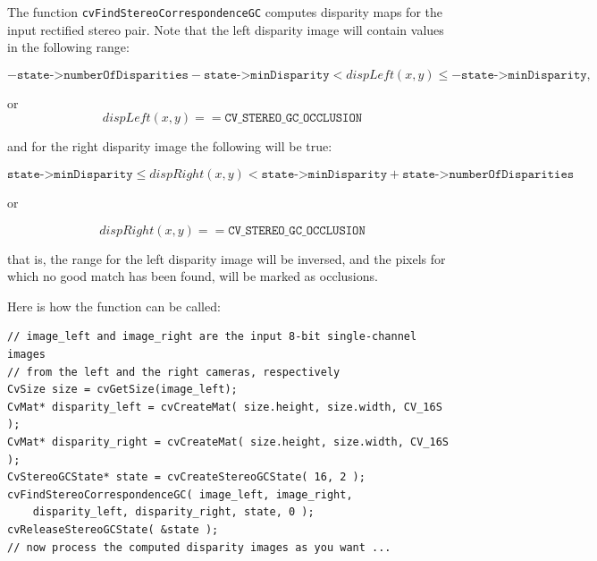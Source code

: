 \begin{description}
\end{description}

The function \texttt{cvFindStereoCorrespondenceGC} computes disparity maps for the input rectified stereo pair. Note that the left disparity image will contain values in the following range: 

\[
-\texttt{state->numberOfDisparities}-\texttt{state->minDisparity}
< dispLeft(x,y) \le -\texttt{state->minDisparity},
\]

or
\[
dispLeft(x,y) == \texttt{CV\_STEREO\_GC\_OCCLUSION}
\]

and for the right disparity image the following will be true: 

\[
\texttt{state->minDisparity} \le dispRight(x,y) 
< \texttt{state->minDisparity} + \texttt{state->numberOfDisparities}
\]

or

\[
dispRight(x,y) == \texttt{CV\_STEREO\_GC\_OCCLUSION}
\]

that is, the range for the left disparity image will be inversed,
and the pixels for which no good match has been found, will be marked
as occlusions.

Here is how the function can be called:

\begin{lstlisting}
// image_left and image_right are the input 8-bit single-channel images
// from the left and the right cameras, respectively
CvSize size = cvGetSize(image_left);
CvMat* disparity_left = cvCreateMat( size.height, size.width, CV_16S );
CvMat* disparity_right = cvCreateMat( size.height, size.width, CV_16S );
CvStereoGCState* state = cvCreateStereoGCState( 16, 2 );
cvFindStereoCorrespondenceGC( image_left, image_right,
    disparity_left, disparity_right, state, 0 );
cvReleaseStereoGCState( &state );
// now process the computed disparity images as you want ...
\end{lstlisting}

